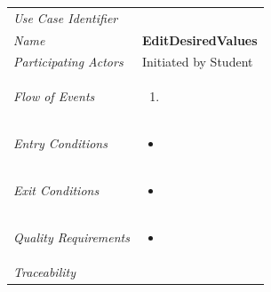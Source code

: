 \documentclass[12pt,letterpaper]{article}
\begin{document}
\begin{center}
	\begin{tabu} to 
		\toprule
		Use Case Identifier & \editdesiredvalues{} \\
		Name & {\bf EditDesiredValues} \\
		Participating Actors & Initiated by Student \\
		Flow of Events & 
	    \begin{enumerate}[topsep=-1em, leftmargin=*]
		    \item 
		\end{enumerate} \\

		Entry Conditions &
		\begin{itemize}[topsep=-1em, leftmargin=*]
		    \item 
        \end{itemize} \\

		Exit Conditions &
		\begin{itemize}[topsep=-1em, leftmargin=*]
		    \item 
        \end{itemize} \\

		Quality Requirements &
		\begin{itemize}[topsep=-1em, leftmargin=*]
		    \item 
        \end{itemize} \\

		Traceability &  \\
		\toprule
	\end{tabu}
\end{center}
\end{document}
